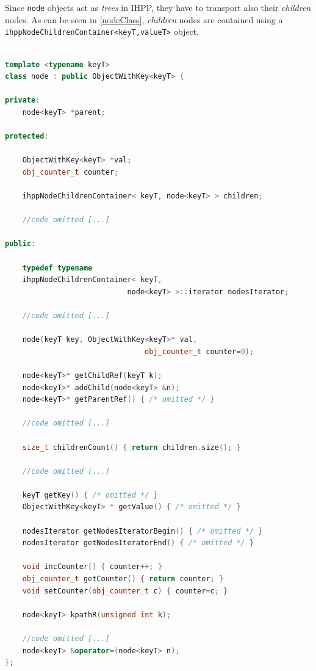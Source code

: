 \documentclass[a4paper,10pt]{report}
\begin{document}
Since \verb|node| objects act as \emph{trees} in IHPP, they have to transport 
also their \emph{children} nodes. As can be seen in \cref{nodeClass}, 
\emph{children} nodes are contained using a 
\verb|ihppNodeChildrenContainer<keyT,valueT>| object.

\begin{lstlisting}[language=C++, 
	caption={partial definition of \texttt{node<keyT>} class}, 
	label=nodeClass, frame=leftline]

template <typename keyT>
class node : public ObjectWithKey<keyT> {

private:
	node<keyT> *parent; 

protected:

	ObjectWithKey<keyT> *val;
	obj_counter_t counter;

	ihppNodeChildrenContainer< keyT, node<keyT> > children;
	
	//code omitted [...]

public:

	typedef typename 
	ihppNodeChildrenContainer< keyT, 
							node<keyT> >::iterator nodesIterator;

	//code omitted [...]

	node(keyT key, ObjectWithKey<keyT>* val, 
								obj_counter_t counter=0);

	node<keyT>* getChildRef(keyT k);
	node<keyT>* addChild(node<keyT> &n);
	node<keyT>* getParentRef() { /* omitted */ }

	//code omitted [...]

	size_t childrenCount() { return children.size(); }

	//code omitted [...]

	keyT getKey() { /* omitted */ }
	ObjectWithKey<keyT> * getValue() { /* omitted */ }
	
	nodesIterator getNodesIteratorBegin() { /* omitted */ }
	nodesIterator getNodesIteratorEnd() { /* omitted */ }	

	void incCounter() { counter++; }
	obj_counter_t getCounter() { return counter; }
	void setCounter(obj_counter_t c) { counter=c; }

	node<keyT> kpathR(unsigned int k);

	//code omitted [...]
	node<keyT> &operator=(node<keyT> n);
};

\end{lstlisting}
\end{document}
